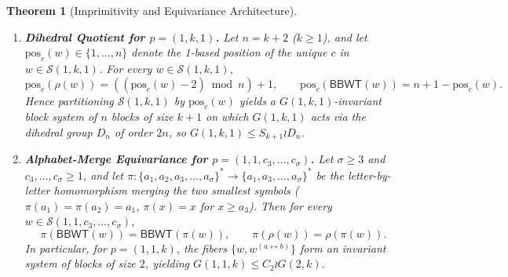 \documentclass[11pt,a4paper]{article}
\newtheorem{theorem}{Theorem}
\theoremstyle{definition}
\newcommand{\BBWT}{\mathsf{BBWT}}
\newcommand{\pos}{\mathrm{pos}}
\begin{document}
\begin{theorem}[Imprimitivity and Equivariance Architecture]
\label{thm:group-architecture}
\leavevmode
\begin{enumerate}[label=(\alph*),leftmargin=*]
    \item \textbf{Dihedral Quotient for $p = (1, k, 1)$.} Let $n = k + 2$ ($k \ge 1$), and let $\pos_c(w) \in \{1,\dots,n\}$ denote the 1-based position of the unique $c$ in $w \in \mathcal{S}(1,k,1)$. For every $w \in \mathcal{S}(1,k,1)$,
    \[
    \pos_c(\rho(w)) = ((\pos_c(w) - 2) \bmod n) + 1, \qquad
    \pos_c(\BBWT(w)) = n + 1 - \pos_c(w).
    \]
    Hence partitioning $\mathcal{S}(1,k,1)$ by $\pos_c(w)$ yields a $G(1,k,1)$-invariant block system of $n$ blocks of size $k+1$ on which $G(1,k,1)$ acts via the dihedral group $D_n$ of order $2n$, so $G(1,k,1) \le S_{k+1} \wr D_n$.
    \item \textbf{Alphabet-Merge Equivariance for $p = (1, 1, c_3, \dots, c_\sigma)$.} Let $\sigma \ge 3$ and $c_3,\dots,c_\sigma \ge 1$, and let $\pi : \{a_1, a_2, a_3, \dots, a_\sigma\}^* \to \{a_1, a_3, \dots, a_\sigma\}^*$ be the letter-by-letter homomorphism merging the two smallest symbols ($\pi(a_1) = \pi(a_2) = a_1$, $\pi(x) = x$ for $x \ge a_3$). Then for every $w \in \mathcal{S}(1, 1, c_3, \dots, c_\sigma)$,
    \[
    \pi(\BBWT(w)) = \BBWT(\pi(w)), \qquad \pi(\rho(w)) = \rho(\pi(w)).
    \]
    In particular, for $p = (1, 1, k)$, the fibers $\{w, w^{(a \leftrightarrow b)}\}$ form an invariant system of blocks of size $2$, yielding $G(1, 1, k) \le C_2 \wr G(2, k)$.
\end{enumerate}
\end{theorem}
\end{document}
